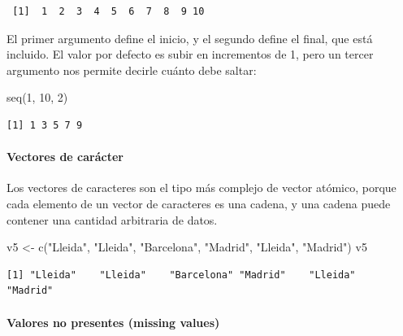 \documentclass[
  letterpaper,
  DIV=11,
  numbers=noendperiod]{scrreprt}
\let\oldparagraph\paragraph
\renewcommand{\paragraph}[1]{\oldparagraph{#1}\mbox{}}
\newenvironment{Shaded}{\begin{snugshade}}{\end{snugshade}}
\newcommand{\DecValTok}[1]{\textcolor[rgb]{0.68,0.00,0.00}{#1}}
\newcommand{\FunctionTok}[1]{\textcolor[rgb]{0.28,0.35,0.67}{#1}}
\newcommand{\NormalTok}[1]{\textcolor[rgb]{0.00,0.23,0.31}{#1}}
\newcommand{\OtherTok}[1]{\textcolor[rgb]{0.00,0.23,0.31}{#1}}
\newcommand{\StringTok}[1]{\textcolor[rgb]{0.13,0.47,0.30}{#1}}
\begin{document}
\begin{verbatim}
 [1]  1  2  3  4  5  6  7  8  9 10
\end{verbatim}

El primer argumento define el inicio, y el segundo define el final, que
está incluido. El valor por defecto es subir en incrementos de 1, pero
un tercer argumento nos permite decirle cuánto debe saltar:

\begin{Shaded}
\begin{Highlighting}[]
\FunctionTok{seq}\NormalTok{(}\DecValTok{1}\NormalTok{, }\DecValTok{10}\NormalTok{, }\DecValTok{2}\NormalTok{)}
\end{Highlighting}
\end{Shaded}

\begin{verbatim}
[1] 1 3 5 7 9
\end{verbatim}

\hypertarget{vectores-de-caruxe1cter}{%
\paragraph{Vectores de carácter}\label{vectores-de-caruxe1cter}}

Los vectores de caracteres son el tipo más complejo de vector atómico,
porque cada elemento de un vector de caracteres es una cadena, y una
cadena puede contener una cantidad arbitraria de datos.

\begin{Shaded}
\begin{Highlighting}[]
\NormalTok{v5 }\OtherTok{\textless{}{-}} \FunctionTok{c}\NormalTok{(}\StringTok{"Lleida"}\NormalTok{, }\StringTok{"Lleida"}\NormalTok{, }\StringTok{"Barcelona"}\NormalTok{, }\StringTok{"Madrid"}\NormalTok{, }\StringTok{"Lleida"}\NormalTok{, }\StringTok{"Madrid"}\NormalTok{)}
\NormalTok{v5}
\end{Highlighting}
\end{Shaded}

\begin{verbatim}
[1] "Lleida"    "Lleida"    "Barcelona" "Madrid"    "Lleida"    "Madrid"   
\end{verbatim}

\hypertarget{valores-no-presentes-missing-values}{%
\paragraph{Valores no presentes (missing
values)}\label{valores-no-presentes-missing-values}}
\end{document}
